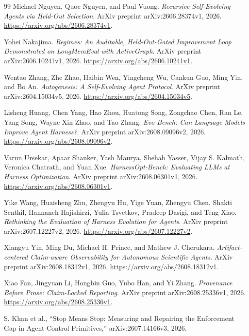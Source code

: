 \documentclass[11pt,a4paper]{article}
\begin{document}
\begin{thebibliography}{99}
Michael Nguyen, Quoc Nguyen, and Paul Vuong.
\emph{Recursive Self-Evolving Agents via Held-Out Selection}.
ArXiv preprint arXiv:2606.28374v1, 2026.
\url{https://arxiv.org/abs/2606.28374v1}.

Yohei Nakajima.
\emph{Regimes: An Auditable, Held-Out-Gated Improvement Loop Demonstrated on
LongMemEval with ActiveGraph}.
ArXiv preprint arXiv:2606.10241v1, 2026.
\url{https://arxiv.org/abs/2606.10241v1}.

Wentao Zhang, Zhe Zhao, Haibin Wen, Yingcheng Wu, Cankun Guo, Ming Yin, and Bo An.
\emph{Autogenesis: A Self-Evolving Agent Protocol}.
ArXiv preprint arXiv:2604.15034v5, 2026.
\url{https://arxiv.org/abs/2604.15034v5}.

Lisheng Huang, Chen Yang, Hao Zhou, Huatong Song, Zongchao Chen, Ran Le,
Yang Song, Wayne Xin Zhao, and Tao Zhang.
\emph{Evo-Bench: Can Language Models Improve Agent Harness?}.
ArXiv preprint arXiv:2608.09096v2, 2026.
\url{https://arxiv.org/abs/2608.09096v2}.

Varun Ursekar, Apaar Shanker, Yash Maurya, Shehab Yasser, Vijay S. Kalmath,
Veronica Chatrath, and Yuan Xue.
\emph{HarnessOpt-Bench: Evaluating LLMs at Harness Optimization}.
ArXiv preprint arXiv:2608.06301v1, 2026.
\url{https://arxiv.org/abs/2608.06301v1}.

Yike Wang, Huaisheng Zhu, Zhengyu Hu, Yige Yuan, Zhengyu Chen, Shakti Senthil,
Hannaneh Hajishirzi, Yulia Tsvetkov, Pradeep Dasigi, and Teng Xiao.
\emph{Rethinking the Evaluation of Harness Evolution for Agents}.
ArXiv preprint arXiv:2607.12227v2, 2026.
\url{https://arxiv.org/abs/2607.12227v2}.

Xiangyu Yin, Ming Du, Michael H. Prince, and Mathew J. Cherukara.
\emph{Artifact-centered Claim-aware Observability for Autonomous Scientific
Agents}.
ArXiv preprint arXiv:2608.18312v1, 2026.
\url{https://arxiv.org/abs/2608.18312v1}.

Xiao Fan, Jingyuan Li, Hongbin Guo, Yubo Han, and Yi Zhang.
\emph{Provenance Before Prose: Claim-Locked Reporting}.
ArXiv preprint arXiv:2608.25336v1, 2026.
\url{https://arxiv.org/abs/2608.25336v1}.

S. Khan et al., ``Stop Means Stop: Measuring and Repairing the Enforcement Gap in Agent Control Primitives,'' arXiv:2607.14166v3, 2026.


\end{thebibliography}
\end{document}
